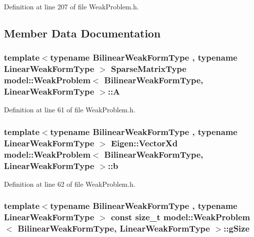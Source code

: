 Definition at line 207 of file Weak\+Problem.\+h.



\subsection{Member Data Documentation}
\hypertarget{classmodel_1_1_weak_problem_a95f04f609e8e1c267c577ee22fbc816b}{}
\subsubsection[{A}]{\setlength{\rightskip}{0pt plus 5cm}template$<$typename Bilinear\+Weak\+Form\+Type , typename Linear\+Weak\+Form\+Type $>$ {\bf Sparse\+Matrix\+Type} {\bf model\+::\+Weak\+Problem}$<$ Bilinear\+Weak\+Form\+Type, Linear\+Weak\+Form\+Type $>$\+::A}\label{classmodel_1_1_weak_problem_a95f04f609e8e1c267c577ee22fbc816b}


Definition at line 61 of file Weak\+Problem.\+h.

\hypertarget{classmodel_1_1_weak_problem_ac2a1aaf942f5f779ec4a2869acf61e5c}{}
\subsubsection[{b}]{\setlength{\rightskip}{0pt plus 5cm}template$<$typename Bilinear\+Weak\+Form\+Type , typename Linear\+Weak\+Form\+Type $>$ Eigen\+::\+Vector\+Xd {\bf model\+::\+Weak\+Problem}$<$ Bilinear\+Weak\+Form\+Type, Linear\+Weak\+Form\+Type $>$\+::b}\label{classmodel_1_1_weak_problem_ac2a1aaf942f5f779ec4a2869acf61e5c}


Definition at line 62 of file Weak\+Problem.\+h.

\hypertarget{classmodel_1_1_weak_problem_ac0eb7600ebecb8e0cf840c25382b82b3}{}
\subsubsection[{g\+Size}]{\setlength{\rightskip}{0pt plus 5cm}template$<$typename Bilinear\+Weak\+Form\+Type , typename Linear\+Weak\+Form\+Type $>$ const size\+\_\+t {\bf model\+::\+Weak\+Problem}$<$ Bilinear\+Weak\+Form\+Type, Linear\+Weak\+Form\+Type $>$\+::g\+Size}\label{classmodel_1_1_weak_problem_ac0eb7600ebecb8e0cf840c25382b82b3}



